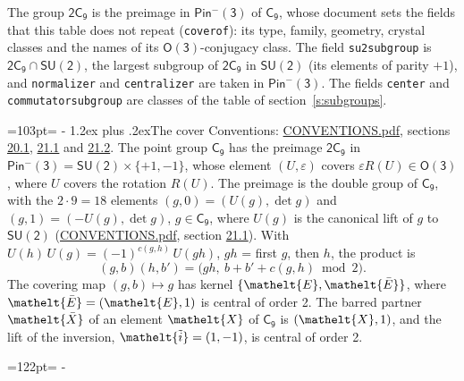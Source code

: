 \documentclass[10pt,a4paper]{article}
\makeatletter
\renewcommand\section{\@startsection{section}{1}{\z@}{-3ex plus -1ex minus -.2ex}%
  {1.2ex plus .2ex}{\normalfont\large\sffamily\bfseries\color{parttitle}}}
\newcommand{\needspace}[1]{\par\penalty-100\begingroup\dimen0=#1\relax\dimen2=\pagegoal
  \advance\dimen2-\pagetotal\ifdim\dimen0>\dimen2\relax\ifdim\dimen2>0pt\vfil\break\fi\fi
  \endgroup}
\numberwithin{equation}{section}
\newcommand{\eltfont}[1]{{\let\sigma\eltsigma\mathelt{#1}}}
\newcommand{\grp}[1]{\mathsf{#1}}
\newcommand{\elt}[1]{\eltfont{#1}}
\newcommand{\dirprod}{\times}
\newcommand{\barred}[1]{\bar{#1}}
\newcommand{\lift}[1]{\tilde{#1}}
\makeatother
\begin{document}
\leavevmode\label{n:element.inversion}\label{n:group.preimage}The group $\grp{2C_{9}}$ is the preimage in $\grp{Pin^{-}(3)}$ of \href{../../../rotation/data/pdf/C9.pdf}{$\grp{C_{9}}$}, whose document sets the fields that this table does not repeat (\texttt{coverof}): its type, family, geometry, crystal classes and the names of its \href{../../../rotation/data/pdf/O3.pdf}{$\grp{O(3)}$}-conjugacy class. The field \texttt{su2subgroup} is $\grp{2C_{9}} \cap \grp{SU(2)}$, the largest subgroup of $\grp{2C_{9}}$ in $\grp{SU(2)}$ (its elements of parity $+1$), and \texttt{normalizer} and \texttt{centralizer} are taken in $\grp{Pin^{-}(3)}$. The fields \texttt{center} and \texttt{commutatorsubgroup} are classes of the table of section~\ref{s:subgroups}.
\needspace{103pt}
\section{The cover}\label{s:cover}
Conventions: \href{../../CONVENTIONS.pdf}{CONVENTIONS.pdf}, sections \href{../../CONVENTIONS.pdf\#conv.20.1}{20.1}, \href{../../CONVENTIONS.pdf\#conv.21.1}{21.1} and \href{../../CONVENTIONS.pdf\#conv.21.2}{21.2}.
\leavevmode\label{n:group.pin.minus}\label{n:group.su2}\label{n:local.pin.sign}\label{n:matrix.covered}\label{n:matrix.lift.su2}\label{n:index.bar}The point group $\grp{C_{9}}$ has the preimage $\grp{2C_{9}}$ in $\grp{Pin^{-}(3)} = \grp{SU(2)} \dirprod \{+1, -1\}$, whose element $(U, \varepsilon)$ covers $\varepsilon R(U) \in \grp{O(3)}$, where $U$ covers the rotation $R(U)$. The preimage is the double group of $\grp{C_{9}}$, with the $2 \cdot 9 = 18$ elements $(g, 0) = (U(g), \det g)$ and $(g, 1) = (-U(g), \det g)$, $g \in \grp{C_{9}}$, where $U(g)$ is the canonical lift of $g$ to $\grp{SU(2)}$ (\href{../../CONVENTIONS.pdf}{CONVENTIONS.pdf}, section \href{../../CONVENTIONS.pdf\#conv.21.1}{21.1}). \label{n:function.cocycle}With $U(h)\,U(g) = (-1)^{c(g,h)}\,U(gh)$, $gh$ = first $g$, then $h$, the product is
\begin{equation}\label{e:product}(g, b)(h, b') = \bigl(gh,\ b + b' + c(g, h) \bmod 2\bigr).\end{equation}
\leavevmode\label{n:mark.bar}The covering map $(g, b) \mapsto g$ has kernel $\{\elt{E}, \elt{\barred{E}}\}$, where $\elt{\barred{E}} = (\elt{E}, 1)$ is central of order 2. \label{n:element.named}\label{n:mark.lift}The barred partner $\elt{\barred{X}}$ of an element $\elt{X}$ of $\grp{C_{9}}$ is $(\elt{X}, 1)$, and the lift of the inversion, $\elt{\lift{i}} = (1, -1)$, is central of order 2.
\needspace{122pt}
\end{document}
